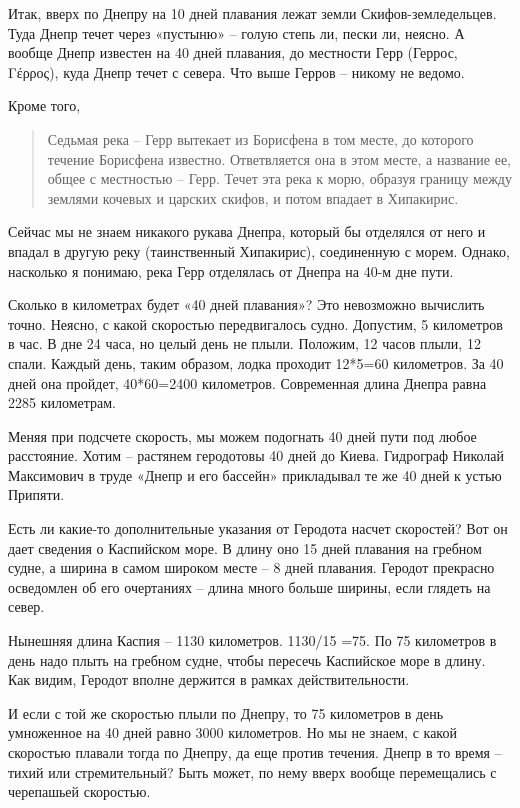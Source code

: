 Итак, вверх по Днепру на 10 дней плавания лежат земли Скифов-земледельцев. Туда Днепр течет через «пустыню» – голую степь ли, пески ли, неясно. А вообще Днепр известен на 40 дней плавания, до местности Герр (Геррос, Γέρρος), куда Днепр течет с севера. Что выше Герров – никому не ведомо.

Кроме того,

\begin{quotation}
Седьмая река – Герр вытекает из Борисфена в том месте, до которого течение Борисфена известно. Ответвляется она в этом месте, а название ее, общее с местностью – Герр. Течет эта река к морю, образуя границу между землями кочевых и царских скифов, и потом впадает в Хипакирис.
\end{quotation}

Сейчас мы не знаем никакого рукава Днепра, который бы отделялся от него и впадал в другую реку (таинственный Хипакирис), соединенную с морем. Однако, насколько я понимаю, река Герр отделялась от Днепра на 40-м дне пути.

Сколько в километрах будет «40 дней плавания»? Это невозможно вычислить точно. Неясно, с какой скоростью передвигалось судно. Допустим, 5 километров в час. В дне 24 часа, но целый день не плыли. Положим, 12 часов плыли, 12 спали. Каждый день, таким образом, лодка проходит 12*5=60 километров. За 40 дней она пройдет, 40*60=2400 километров. Современная длина Днепра равна 2285 километрам.

Меняя при подсчете скорость, мы можем подогнать 40 дней пути под любое расстояние. Хотим – растянем геродотовы 40 дней до Киева. Гидрограф Николай Максимович в труде «Днепр и его бассейн»\cite{maxdnepr01} прикладывал те же 40 дней к устью Припяти.

Есть ли какие-то дополнительные указания от Геродота насчет скоростей? Вот он дает сведения о Каспийском море. В длину оно 15 дней плавания на гребном судне, а ширина в самом широком месте – 8 дней плавания. Геродот прекрасно осведомлен об его очертаниях – длина много больше ширины, если глядеть на север.

Нынешняя длина Каспия – 1130 километров. 1130/15 =75. По 75 километров в день надо плыть на гребном судне, чтобы пересечь Каспийское море в длину. Как видим, Геродот вполне держится в рамках действительности.

И если с той же скоростью плыли по Днепру, то 75 километров в день умноженное на 40 дней равно 3000 километров. Но мы не знаем, с какой скоростью плавали тогда по Днепру, да еще против течения. Днепр в то время – тихий или стремительный? Быть может, по нему вверх вообще перемещались с черепашьей скоростью.

